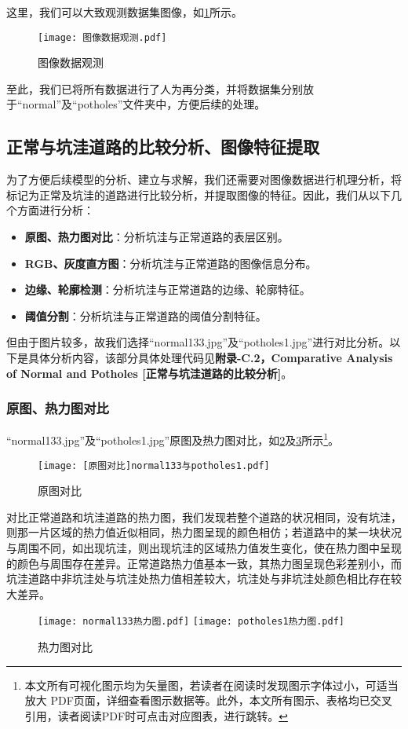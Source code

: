 \documentclass{MathorCupmodeling}
\begin{document}
	这里，我们可以大致观测数据集图像，如\textcolor{blue}{\cref{fig:图像数据观测}}所示。
	\begin{figure}[H]
		\centering
		\texttt{[image: 图像数据观测.pdf]}
		\caption{图像数据观测}
		\label{fig:图像数据观测}
	\end{figure}
	至此，我们已将所有数据进行了人为再分类，并将数据集分别放于“normal”及“potholes”文件夹中，方便后续的处理。
	\subsection{正常与坑洼道路的比较分析、图像特征提取}\label{分析}
	为了方便后续模型的分析、建立与求解，我们还需要对图像数据进行机理分析，将标记为正常及坑洼的道路进行比较分析，并提取图像的特征。因此，我们从以下几个方面进行分析：
	\begin{itemize}
		\item \textbf{原图、热力图对比}：分析坑洼与正常道路的表层区别。
		\item \textbf{RGB、灰度直方图}：分析坑洼与正常道路的图像信息分布。
		\item \textbf{边缘、轮廓检测}：分析坑洼与正常道路的边缘、轮廓特征。
		\item \textbf{阈值分割}：分析坑洼与正常道路的阈值分割特征。
	\end{itemize}
	
	但由于图片较多，故我们选择“normal133.jpg”及“potholes1.jpg”进行对比分析。以下是具体分析内容，该部分具体处理代码见\textbf{附录-C.2，Comparative Analysis of Normal and Potholes [正常与坑洼道路的比较分析]}。
	\subsubsection{原图、热力图对比}
	“normal133.jpg”及“potholes1.jpg”原图及热力图对比，如\textcolor{blue}{\cref{fig:原图对比}}及\textcolor{blue}{\cref{fig:热力图对比}}所示\textcolor{blue}{\footnote{本文所有可视化图示均为矢量图，若读者在阅读时发现图示字体过小，可适当放大 PDF页面，详细查看图示数据等。此外，本文所有图示、表格均已交叉引用，读者阅读PDF时可点击对应图表，进行跳转。}}。
	\begin{figure}[H]
		\centering
			\centering
			\texttt{[image: [原图对比]normal133与potholes1.pdf]}
			\caption{原图对比}
			\label{fig:原图对比}
	\end{figure}
	
	对比正常道路和坑洼道路的热力图，我们发现若整个道路的状况相同，没有坑洼，则那一片区域的热力值近似相同，热力图呈现的颜色相仿；若道路中的某一块状况与周围不同，如出现坑洼，则出现坑洼的区域热力值发生变化，使在热力图中呈现的颜色与周围存在差异。正常道路热力值基本一致，其热力图呈现色彩差别小，而坑洼道路中非坑洼处与坑洼处热力值相差较大，坑洼处与非坑洼处颜色相比存在较大差异。
	\begin{figure}[H]
		\centering
		\texttt{[image: normal133热力图.pdf]}
		\hspace{0.3in}
		\texttt{[image: potholes1热力图.pdf]}
		\caption{热力图对比}
		\label{fig:热力图对比}
	\end{figure}
\end{document}

